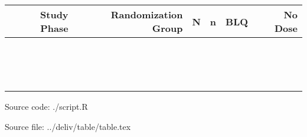 \documentclass[varwidth, border={10 5 50 5}]{standalone}
\begin{document}
\begin{tabular}{rrrrrr}
  \hline \hline
 Study Phase & Randomization Group & N & n & BLQ & No Dose \\ \hline
 \verb#183# & \verb#1# & \verb#15# & \verb#66# & \verb#0# & \verb#11# \\
 \verb#183# & \verb#2# & \verb#16# & \verb#61# & \verb#0# & \verb#10# \\
 \verb#183# & \verb#3# & \verb#15# & \verb#73# & \verb#0# & \verb#13# \\
 \verb#183# & \verb#4# & \verb#16# & \verb#77# & \verb#0# & \verb#14# \\
 \verb#183# & \verb#5# & \verb#16# & \verb#79# & \verb#0# & \verb#13# \\
 \verb#390# & \verb#1# & \verb#33# & \verb#92# & \verb#0# & \verb#10# \\
 \verb#390# & \verb#2# & \verb#35# & \verb#113# & \verb#0# & \verb#10# \\
 \verb#390# & \verb#3# & \verb#32# & \verb#91# & \verb#2# & \verb#11# \\
 \verb#390# & \verb#4# & \verb#36# & \verb#108# & \verb#0# & \verb#8# \\
 \verb#390# & \verb#5# & \verb#35# & \verb#124# & \verb#0# & \verb#8# \\
 \verb#620# & \verb#1# & \verb#56# & \verb#193# & \verb#9# & \verb#15# \\
 \verb#620# & \verb#2# & \verb#56# & \verb#194# & \verb#11# & \verb#13# \\
 \verb#620# & \verb#3# & \verb#57# & \verb#224# & \verb#13# & \verb#15# \\
 \verb#620# & \verb#4# & \verb#54# & \verb#197# & \verb#7# & \verb#16# \\
 \verb#620# & \verb#5# & \verb#57# & \verb#209# & \verb#10# & \verb#11# \\ \hline
\end{tabular}
 
{\raggedleft \tiny Source code: ./script.R}
 
\vspace{-5pt}
{\raggedleft \tiny Source file: ../deliv/table/table.tex}
\end{document}
